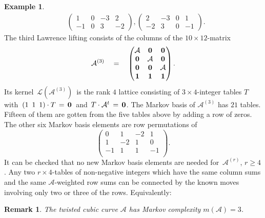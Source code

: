 \documentclass[11pt]{amsart}
\newtheorem{remark}[theorem]{Remark}
\theoremstyle{definition}
\newtheorem{example}[theorem]{Example}
\renewcommand{\L}{{\mathcal L}}
\newcommand{\A}{{\mathcal A}}
\begin{document}
\begin{example}
\begin{eqnarray*}
& \begin{pmatrix} 1 & 0 & -3 & 2 \\ -1 & 0 & 3 & -2 \end{pmatrix},
  \begin{pmatrix} 2 & -3 & 0 & 1 \\ -2 & 3 & 0 & - 1 \end{pmatrix}.
  \end{eqnarray*}
The third Lawrence lifting consists of the columns of
the $10 \times 12$-matrix
\begin{equation}
\label{Athree}
\A^{(3)} \quad = \quad
\begin{pmatrix}
\A & {\bf 0} & {\bf 0} \\
{\bf 0} & \A  & {\bf 0}\\
{\bf 0} & {\bf 0} & \A \\
{\bf 1} & {\bf 1}& {\bf 1}
\end{pmatrix}.
\end{equation}
Its kernel $\, \L(\A^{(3)}) \,$ is the rank $4$ lattice
consisting of $3 \times 4$-integer tables $T$
with $\, (1 \,\,\,1 \,\,\, 1) \cdot T\, = \, {\bf 0} \,$
and $\,T \cdot \A^t \, = \, {\bf 0} $. The
Markov basis of $\A^{(3)}$ has $21$ tables. Fifteen
of them are gotten from the five tables above by adding a row of zeros.
The other six Markov  basis elements are  row permutations of
\begin{equation}
  \begin{pmatrix}
  0 & 1 & -2 & 1 \\
  1 & -2 & 1 & 0 \\
  -1 & 1 & 1 & -1 \\
  \end{pmatrix}.
\label{eqn:markovtype3}
\end{equation}
It can be checked that no new Markov basis elements are needed
for $\, \A^{(r)}$, $ r \geq 4 $. Any
two $r \times 4$-tables of non-negative integers
which have the same column sums and the same
$\A$-weighted row sums can be connected by
the known moves involving only two or three of the rows.
Equivalently:
\begin{remark}
The twisted cubic curve $\A$ has Markov complexity  $m(\A) = 3$.
\end{remark}


\end{example}
\end{document}
